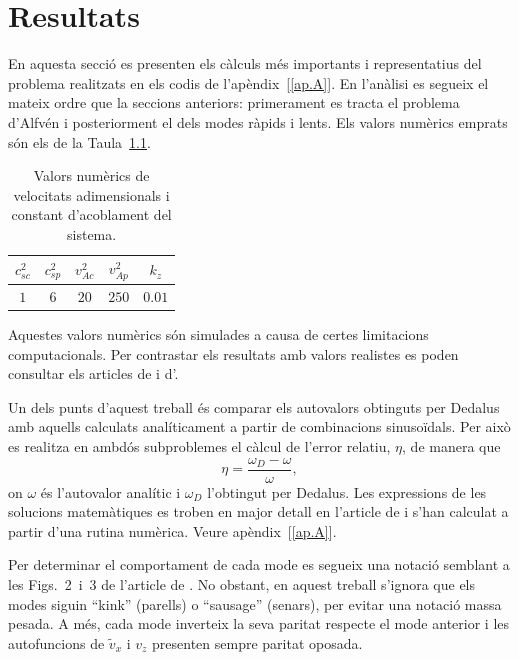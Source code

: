 
\chapter{Resultats} \label{sec:resultats}
En aquesta secció es presenten els càlculs més importants i representatius del problema realitzats en els codis de l'apèndix~[\ref{ap.A}].
En l'anàlisi es segueix el mateix ordre que la seccions anteriors: primerament es tracta el problema d'Alfvén i posteriorment el dels modes ràpids i lents.
Els valors numèrics emprats són els de la Taula~\ref{tab:valors}.
\begin{table}[H]
	\centering
	\begin{tabular}{|c|c|c|c|c|}
		\hline
		$c_{s c}^2$ & $c_{s p}^2$ & $v_{A c}^2$ & $v_{A p}^2$ & $k_z$ \\
		\hline
		$1$ & $6$ & $20$ & $250$ & $0.01$ \\
		\hline
	\end{tabular}
	\caption{Valors numèrics de velocitats adimensionals i constant d'acoblament del sistema.}
	\label{tab:valors}
\end{table}
\vspace{-10pt}
Aquestes valors numèrics són simulades a causa de certes limitacions computacionals.
Per contrastar els resultats amb valors realistes es poden consultar els articles de \textcite{oscillation_modes_II} i d'\textcite{oscillations_quiescent_solar_prominence}.

Un dels punts d'aquest treball és comparar els autovalors obtinguts per Dedalus amb aquells calculats analíticament a partir de combinacions sinusoïdals. %
Per això es realitza en ambdós subproblemes el càlcul de l'error relatiu, $\eta$, de manera que
\begin{equation}
	\eta = \frac{\omega_D - \omega}{\omega}, \tag{5.1} \label{eq.5.1}
\end{equation}
on $\omega$ és l'autovalor analític i $\omega_D$ l'obtingut per Dedalus.
Les expressions de les solucions matemàtiques es troben en major detall en l'article de \textcite{oscillation_modes_II}
i s'han calculat a partir d'una rutina numèrica. Veure apèndix~[\ref{ap.A}].

Per determinar el comportament de cada mode es segueix una notació semblant a les Figs.~2~i~3 de l'article de \textcite{oscillation_modes_II}.
No obstant, en aquest treball s'ignora que els modes siguin ``kink'' (parells) o ``sausage'' (senars), per evitar una notació massa pesada.
A més, cada mode inverteix la seva paritat respecte el mode anterior i les autofuncions de $\tilde{v}_{x}$ i $v_z$ presenten sempre paritat oposada.

